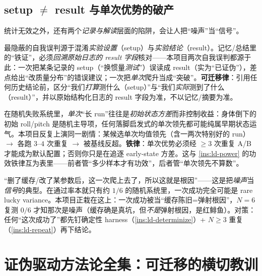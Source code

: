 \subsection{setup \texorpdfstring{$\ne$}{!=} result 与单次优势的破产}
\label{subsec:ld-setup-result}

统计无效之外，还有两个\emph{记录与解读}层面的陷阱，会让人把“噪声”当“信号”。

\begin{insight}\label{ins:ld-setup-result}
最隐蔽的自我误判源于混淆\emph{实验设置}（setup）与\emph{实验结论}（result）。记忆/总结里的“铁证”，必须\emph{回溯原始日志的 result 字段}核对——本项目两次自我误判都源于此：一次把某条记录的 setup（“换惯量\emph{测试}”）误读成 result（实为“已证伪”），差点给出“改质量分布”的错误建议；一次把\emph{单次}爬升当成“突破”。\textbf{可迁移律}：引用任何历史结论前，区分“我们\emph{打算}测什么（setup）”与“我们\emph{实际}测到了什么（result）”，并以原始结构化日志的 result 字段为准，不以记忆/摘要为准。
\end{insight}

\begin{insight}\label{ins:ld-repeat}
在随机失败系统里，\emph{单次}“长 run”往往是\emph{初始状态方差}而非控制收益：身体倒下的初始 roll/pitch 是随机主导项，任何落脚启发式的单次领先都可能纯属早期状态运气。本项目反复上演同一剧情：某候选单次均值领先（含一两次特别好的 run）$\to$ 各跑 $3\text{--}4$ 次重复 $\to$ 被基线反超。\textbf{铁律}：单次优势必须经 $\ge 3$ 次重复 A/B 才能成为默认配置；否则你只是在追逐 early-state 方差。这与 \cref{ins:ld-power} 的功效铁律互为表里——前者管“多少样本才有功效”，后者管“单次领先不算数”。
\end{insight}

\begin{pitfall}[对单次随机成功过度解读]
“删了缓存/改了某参数后，这一次爬上去了，所以这就是根因”——这是把\emph{噪声}当\emph{信号}的典型。在通过率本就只有约 $1/6$ 的随机系统里，一次成功完全可能是 rare lucky variance。本项目正栽在这上：一次成功被当“缓存陈旧=弹射根因”，$N=6$ 复测 $0/6$ 才知那次是噪声（缓存确是真坑，但\emph{不是}弹射根因，是红鲱鱼）。对策：任何“这次成功了”都先钉确定性 harness（\cref{ins:ld-determinize}）+ $N\ge 3$ 重复（\cref{ins:ld-repeat}）再下结论。
\end{pitfall}

\section{证伪驱动方法论全集：可迁移的横切教训}
\label{sec:ld-falsify}

